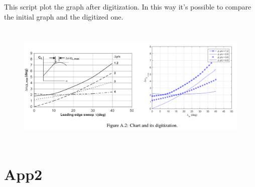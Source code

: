 \noindent \\ \\ 
This script plot the graph after digitization. In this way it's possible to compare the initial graph and the digitized one.

\pagestyle{pippo}
 \begin{figure}[H]
\centering
{\includegraphics[height=6cm]{Immagini/digitize2.png}} 
\label{angles}
\end{figure} 

\chapter{App2}



